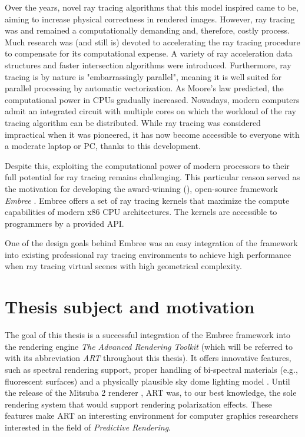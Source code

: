 Over the years, novel ray tracing algorithms that this model inspired came to be, aiming to increase physical correctness in rendered images. However, ray tracing was and remained a computationally demanding and, therefore, costly process. Much research was (and still is) devoted to accelerating the ray tracing procedure to compensate for its computational expense. A variety of ray acceleration data structures and faster intersection algorithms were introduced. Furthermore, ray tracing is by nature is "embarrassingly parallel", meaning it is well suited for parallel processing by automatic vectorization. As Moore’s law predicted, the computational power in CPUs gradually increased. Nowadays, modern computers admit an integrated circuit with multiple cores on which the workload of the ray tracing algorithm can be distributed. While ray tracing was considered impractical when it was pioneered, it has now become accessible to everyone with a moderate laptop or PC, thanks to this development.

Despite this, exploiting the computational power of modern processors to their full potential for ray tracing remains challenging. This particular reason served as the motivation for developing the award-winning (\cite{embreeAward}), open-source framework \emph{Embree} \cite{wald2014embree}. Embree offers a set of ray tracing kernels that maximize the compute capabilities of modern x86 CPU architectures. The kernels are accessible to programmers by a provided API. 

One of the design goals behind Embree was an easy integration of the framework into existing professional ray tracing environments to achieve high performance when ray tracing virtual scenes with high geometrical complexity.


\section*{Thesis subject and motivation}
The goal of this thesis is a successful integration of the Embree framework into the rendering engine \emph{The Advanced Rendering Toolkit} \cite{artSoftware} (which will be referred to with its abbreviation \emph{ART} throughout this thesis). It offers innovative features, such as spectral rendering support, proper handling of bi-spectral materials (e.g., fluorescent surfaces) \cite{mojzik2018handling} and a physically plausible sky dome lighting model \cite{wilkie2013predicting}. Until the release of the Mitsuba 2 renderer \cite{nimier2019mitsuba}, ART was, to our best knowledge, the sole rendering system that would support rendering polarization effects. These features make ART an interesting environment for computer graphics researchers interested in the field of \emph{Predictive Rendering}. 

